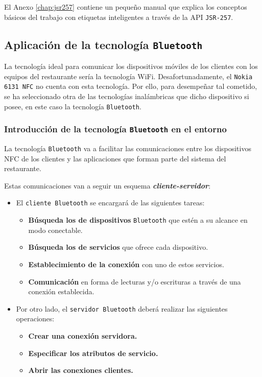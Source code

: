 El Anexo \ref{chap:jsr257} contiene un pequeño manual que explica los conceptos
básicos del trabajo con etiquetas inteligentes a través de la \acs{API}
\texttt{\acs{JSR}-257}.

\subsection{Aplicación de la tecnología \texttt{Bluetooth}}
La tecnología ideal para comunicar los dispositivos móviles de los clientes con
los equipos del restaurante sería la tecnología \acs{WiFi}. Desafortunadamente,
el \texttt{Nokia 6131 \acs{NFC}} no cuenta con esta tecnología. Por ello, para
desempeñar tal cometido, se ha seleccionado otra de las tecnologías
inalámbricas que dicho dispositivo si posee, en este caso la tecnología
\texttt{Bluetooth}.

  \subsubsection{Introducción de la tecnología \texttt{Bluetooth} en el entorno}
La tecnología \texttt{Bluetooth} va a facilitar las comunicaciones entre los
dispositivos \acs{NFC} de los clientes y las aplicaciones que forman parte del 
sistema del restaurante.

Estas comunicaciones van a seguir un esquema \emph{\textbf{cliente-servidor}}:
\begin{itemize}
\item El \texttt{cliente \texttt{Bluetooth}} se encargará de las siguientes 
tareas:
  \begin{itemize}
  \item \textbf{Búsqueda los de dispositivos} \texttt{Bluetooth} que estén a su
alcance en modo conectable.
  \item \textbf{Búsqueda los de servicios} que ofrece cada dispositivo.
  \item \textbf{Establecimiento de la conexión} con uno de estos servicios.
  \item \textbf{Comunicación} en forma de lecturas y/o escrituras a través
de una conexión establecida.
  \end{itemize}
\item Por otro lado, el \texttt{servidor \texttt{Bluetooth}} deberá realizar
las siguientes operaciones:
  \begin{itemize}
  \item \textbf{Crear una conexión servidora.}
  \item \textbf{Especificar los atributos de servicio.}
  \item \textbf{Abrir las conexiones clientes.}
  \end{itemize}
\end{itemize}

